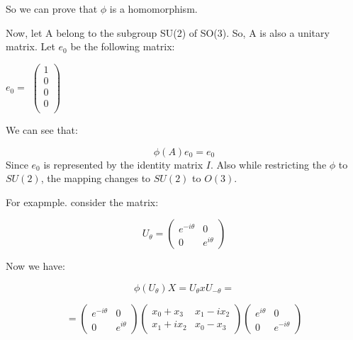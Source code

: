 So we can prove that $\phi$ is a homomorphism.

Now, let A belong to the subgroup SU(2) of SO(3). So, A is also a unitary matrix. Let $e_0$ be the following matrix:
\begin{center}
    $e_0 =$
    $\begin{pmatrix}
    1  \\
    0  \\
    0  \\
    0  \\
    \end{pmatrix}$
\end{center}  

We can see that:

\begin{equation}
    \phi(A)e_0=e_0
\end{equation}
Since $e_0$ is represented by the identity matrix $I$. Also while restricting the $\phi$ to $SU(2)$, the mapping changes to $SU(2)$ to $O(3)$.

For exapmple. consider the matrix:


\begin{center}
\begin{equation}
U_{\theta}=
{
\begin{pmatrix}
  e^{-i\theta} & 0\\
  0 & e^{i\theta}
\end{pmatrix}
}  
\end{equation}
\end{center}

Now we have:
\begin{center}
\begin{equation}
    \phi({U_{\theta}})X=U_{\theta}xU_{-\theta}=
\end{equation}
\end{center}
\begin{center}
\begin{equation}
=
{
\begin{pmatrix}
  e^{-i\theta} & 0\\
  0 & e^{i\theta}
\end{pmatrix}
} 
{
    \begin{pmatrix}
    x_0+x_3 & x_1-ix_2 \\
    x_1+ix_2 & x_0-x_3
    \end{pmatrix}
}
{
\begin{pmatrix}
    e^{i\theta} & 0\\
  0 & e^{-i\theta}
\end{pmatrix}
}
\end{equation}
\end{center}

